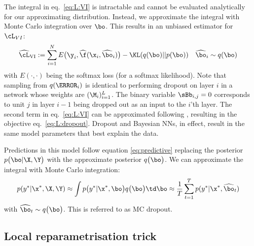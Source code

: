 The integral in eq.\ \eqref{eq:L:VI} is intractable and cannot be evaluated analytically for our approximating distribution. Instead, we approximate the integral with Monte Carlo integration over $\bo$. This results in an unbiased estimator for $\cL_{VI}$:
\begin{align}
\widehat{\cL}_{\text{VI}} := \sum_{i=1}^N E \big( \y_i, \widehat{\f} ( \x_i, \widehat{\bo}_i ) \big) - \KL(q(\bo) || p(\bo)) && \widehat{\bo}_i \sim q(\bo)
\end{align}
with $E(\cdot, \cdot)$ being the softmax loss (for a softmax likelihood).
Note that sampling from $q(\W_i)$ is identical to performing dropout on layer $i$ in a network whose weights are $(\M_i)_{i=1}^L$.
The binary variable $\sBb_{i,j} = 0$ corresponds to unit $j$ in layer $i-1$ being dropped out as an input to the $i$'th layer. The second term in eq.\ \eqref{eq:L:VI} can be approximated following \citep{Gal2015Dropout}, resulting in the objective eq.\ \eqref{eq:L:dropout}.
Dropout and Bayesian NNs, in effect, result in the same model parameters that best explain the data.

Predictions in this model follow equation \eqref{eq:predictive} replacing the posterior $p \big( \bo| \X, \Y \big)$ with the approximate posterior $q \big( \bo \big)$. We can approximate the integral with Monte Carlo integration:
\begin{align} \label{eq:approx_predictive}
p(y^* | \x^*, \X, \Y) \approx 
\int p \big( y^* | \x^*, \bo \big) q \big( \bo \big) 
\td \bo
\approx \frac{1}{T} \sum_{t=1}^T p ( y^* | \x^*, \widehat{\bo}_t )
\end{align}
with $\widehat{\bo}_t \sim q \big( \bo \big)$. This is referred to as MC dropout.

\subsection{Local  reparametrisation  trick}

